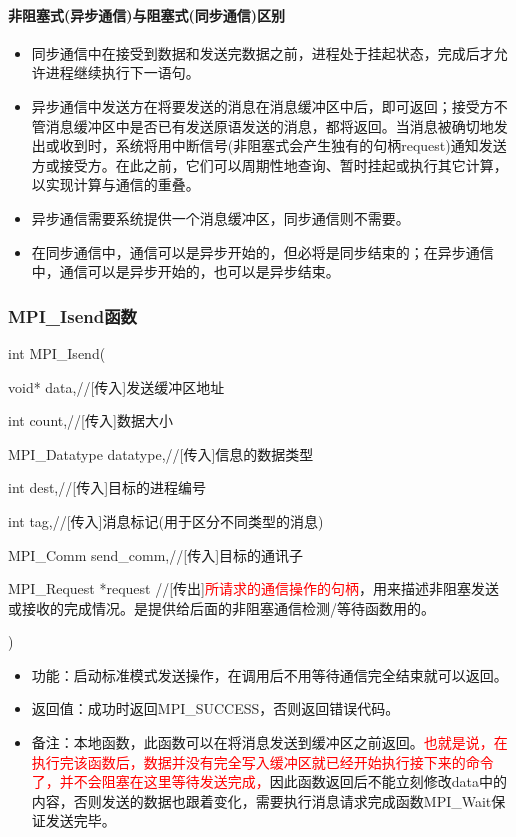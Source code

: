 \documentclass[UTF8]{article}%
\begin{document}
\paragraph{非阻塞式(异步通信)与阻塞式(同步通信)区别}

\begin{itemize}
    \item 同步通信中在接受到数据和发送完数据之前，进程处于挂起状态，完成后才允许进程继续执行下一语句。
    \item 异步通信中发送方在将要发送的消息在消息缓冲区中后，即可返回；接受方不管消息缓冲区中是否已有发送原语发送的消息，都将返回。当消息被确切地发出或收到时，系统将用中断信号(非阻塞式会产生独有的句柄request)通知发送方或接受方。在此之前，它们可以周期性地查询、暂时挂起或执行其它计算，以实现计算与通信的重叠。
    \item 异步通信需要系统提供一个消息缓冲区，同步通信则不需要。
    \item 在同步通信中，通信可以是异步开始的，但必将是同步结束的；在异步通信中，通信可以是异步开始的，也可以是异步结束。
\end{itemize}

\subsubsection{MPI\_Isend函数}

int MPI\_Isend(

    \qquad void*                data,//[传入]发送缓冲区地址

    \qquad int                  count,//[传入]数据大小

    \qquad MPI\_Datatype        datatype,//[传入]信息的数据类型

    \qquad int                  dest,//[传入]目标的进程编号

    \qquad int                  tag,//[传入]消息标记(用于区分不同类型的消息)

    \qquad MPI\_Comm            send\_comm,//[传入]目标的通讯子

    \qquad MPI\_Request         *request //[传出]\textcolor{red}{所请求的通信操作的句柄}，用来描述非阻塞发送或接收的完成情况。是提供给后面的非阻塞通信检测/等待函数用的。
    
    )

\begin{itemize}
    \item 功能：启动标准模式发送操作，在调用后不用等待通信完全结束就可以返回。
    \item 返回值：成功时返回MPI\_SUCCESS，否则返回错误代码。
    \item 备注：本地函数，此函数可以在将消息发送到缓冲区之前返回。\textcolor{red}{也就是说，在执行完该函数后，数据并没有完全写入缓冲区就已经开始执行接下来的命令了，并不会阻塞在这里等待发送完成，}因此函数返回后不能立刻修改data中的内容，否则发送的数据也跟着变化，需要执行消息请求完成函数MPI\_Wait保证发送完毕。
\end{itemize}
\end{document}
